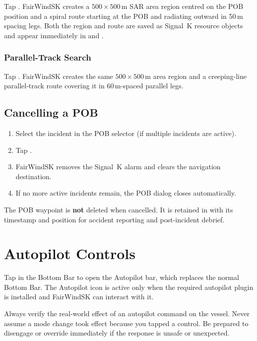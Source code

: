 Tap .
FairWindSK creates a $500 \times 500$\,m SAR area region centred on the POB
position and a spiral route starting at the POB and radiating outward in 50\,m
spacing legs.
Both the region and route are saved as Signal~K resource objects and appear
immediately in  and .

\subsection{Parallel-Track Search}

Tap .
FairWindSK creates the same $500 \times 500$\,m area region and a
creeping-line parallel-track route covering it in 60\,m-spaced parallel legs.

\section{Cancelling a POB}

\begin{enumerate}
  \item Select the incident in the POB selector (if multiple incidents are active).
  \item Tap .
  \item FairWindSK removes the Signal~K alarm and clears the navigation destination.
  \item If no more active incidents remain, the POB dialog closes automatically.
\end{enumerate}

\begin{notebox}
The POB waypoint is \textbf{not} deleted when cancelled.
It is retained in  with its timestamp and position for
accident reporting and post-incident debrief.
\end{notebox}

\chapter{Autopilot Controls}
\label{ch:autopilot}

Tap  in the Bottom Bar to open the Autopilot
bar, which replaces the normal Bottom Bar.
The Autopilot icon is active only when the required autopilot plugin is installed and
FairWindSK can interact with it.

\begin{warningbox}
Always verify the real-world effect of an autopilot command on the vessel.
Never assume a mode change took effect because you tapped a control.
Be prepared to disengage or override immediately if the response is unsafe or
unexpected.
\end{warningbox}

